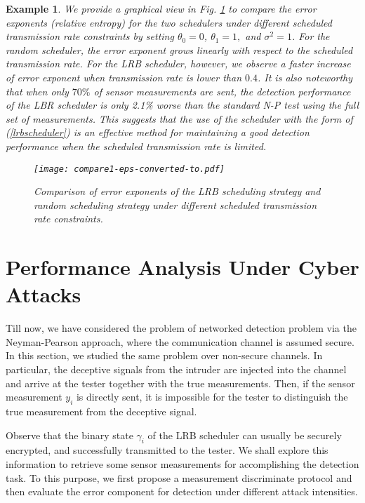 \documentclass[journal]{IEEEtran}
\newtheorem{exam}{Example}
\begin{document}
\begin{exam}
\label{exam1}
We provide a graphical view in Fig. \ref{fig_comparison} to compare the error exponents (relative entropy) for the two schedulers under different scheduled transmission rate constraints by setting $\theta_{0}=0$, $\theta_{1}=1,$ and $\sigma^2=1$. For the random scheduler, the error exponent grows linearly with respect to the scheduled transmission rate. For the LRB scheduler, however, we observe a faster increase of error exponent  when transmission rate is lower than $0.4$. It is also noteworthy that when only $70\%$ of sensor measurements are sent, the detection performance of the LBR scheduler is only 2.1\% worse than the standard N-P test using the full set of measurements. This suggests that the use of the scheduler with the form of (\ref{lrbscheduler}) is an effective method for maintaining a good detection performance when the scheduled transmission rate is limited.

\begin{figure}
  \centering
  \texttt{[image: compare1-eps-converted-to.pdf]}
    \caption{ Comparison of error exponents of the LRB scheduling strategy and random scheduling strategy under different scheduled transmission rate constraints.}
    \label{fig_comparison}
\end{figure}

\end{exam}



\section{Performance Analysis Under Cyber Attacks}
\label{section4}
Till now, we have considered the problem of networked detection problem via the Neyman-Pearson approach, where the communication channel is assumed secure. In this section, we studied the same problem over non-secure channels. In particular, the deceptive signals from the intruder are injected into the channel and arrive at the tester together with the true measurements. Then, if the sensor measurement $y_i$ is directly sent, it is impossible for the tester to distinguish the true measurement from the deceptive signal.

Observe that the binary state  $\gamma_i$  of the LRB scheduler can usually be securely encrypted, and successfully transmitted to the tester. We shall explore this information to retrieve some sensor measurements for accomplishing the detection task. To this purpose, we first propose a measurement discriminate protocol and then evaluate the error component for detection under different attack intensities.
\end{document}
